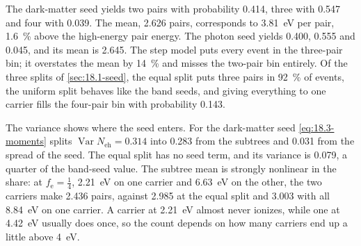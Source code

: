 The dark-matter seed yields two pairs with probability 0.414, three with 0.547 and four with 0.039. The mean, 2.626 pairs, corresponds to \SI{3.81}{eV} per pair, \SI{1.6}{\percent} above the high-energy pair energy. The photon seed yields 0.400, 0.555 and 0.045, and its mean is 2.645. The step model puts every event in the three-pair bin; it overstates the mean by \SI{14}{\percent} and misses the two-pair bin entirely. Of the three splits of \cref{sec:18.1-seed}, the equal split puts three pairs in \SI{92}{\percent} of events, the uniform split behaves like the band seeds, and giving everything to one carrier fills the four-pair bin with probability 0.143.

The variance shows where the seed enters. For the dark-matter seed \cref{eq:18.3-moments} splits $\operatorname{Var}N_{\mathrm{eh}} = 0.314$ into 0.283 from the subtrees and 0.031 from the spread of the seed. The equal split has no seed term, and its variance is 0.079, a quarter of the band-seed value. The subtree mean is strongly nonlinear in the share: at $f_{\mathrm{e}} = \tfrac14$, \SI{2.21}{eV} on one carrier and \SI{6.63}{eV} on the other, the two carriers make 2.436 pairs, against 2.985 at the equal split and 3.003 with all \SI{8.84}{eV} on one carrier. A carrier at \SI{2.21}{eV} almost never ionizes, while one at \SI{4.42}{eV} usually does once, so the count depends on how many carriers end up a little above \SI{4}{eV}.


